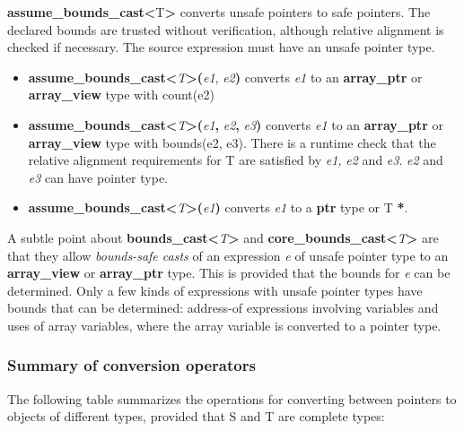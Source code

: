 \textbf{assume\_bounds\_cast\textless{}}T\textbf{\textgreater{}}
converts unsafe pointers to safe pointers. The declared bounds are
trusted without verification, although relative alignment is checked if
necessary. The source expression must have an unsafe pointer type.

\begin{itemize}
\item
  \textbf{assume\_bounds\_cast\textless{}}\emph{T}\textbf{\textgreater{}(}\emph{e1},
  \emph{e2}\textbf{)} converts \emph{e1} to an \textbf{array\_ptr} or
  \textbf{array\_view} type with count(e2)
\item
  \textbf{assume\_bounds\_cast\textless{}}\emph{T}\textbf{\textgreater{}(}\emph{e1}\textbf{,}
  \emph{e2}\textbf{,} \emph{e3}\textbf{)} converts \emph{e1} to an
  \textbf{array\_ptr} or \textbf{array\_view} type with bounds(e2, e3).
  There is a runtime check that the relative alignment requirements for
  T are satisfied by \emph{e1,} \emph{e2} and \emph{e3}. \emph{e2} and
  \emph{e3} can have pointer type.
\item
  \textbf{assume\_bounds\_cast\textless{}}\emph{T}\textbf{\textgreater{}(}\emph{e1}\textbf{)}
  converts \emph{e1} to a \textbf{ptr} type or T \textbf{*}.
\end{itemize}

A subtle point about
\textbf{bounds\_cast\textless{}}\emph{T}\textbf{\textgreater{}} and
\textbf{core\_bounds\_cast\textless{}}\emph{T}\textbf{\textgreater{}}
are that they allow \emph{\emph{bounds-safe casts}} of an expression
\emph{e} of unsafe pointer type to an \textbf{array\_view} or
\textbf{array\_ptr} type. This is provided that the bounds for \emph{e}
can be determined. Only a few kinds of expressions with unsafe pointer
types have bounds that can be determined: address-of expressions
involving variables and uses of array variables, where the array
variable is converted to a pointer type.

\subsubsection{\texorpdfstring{\protect\hypertarget{ux5fToc437460801}{}{\protect\hypertarget{ux5fToc440445482}{}{\protect\hypertarget{ux5fToc440449264}{}{\protect\hypertarget{ux5fToc440551914}{}{}}}}Summary
of conversion
operators}{Summary of conversion operators}}\label{summary-of-conversion-operators}

The following table summarizes the operations for converting between
pointers to objects of different types, provided that S and T are
complete types:

